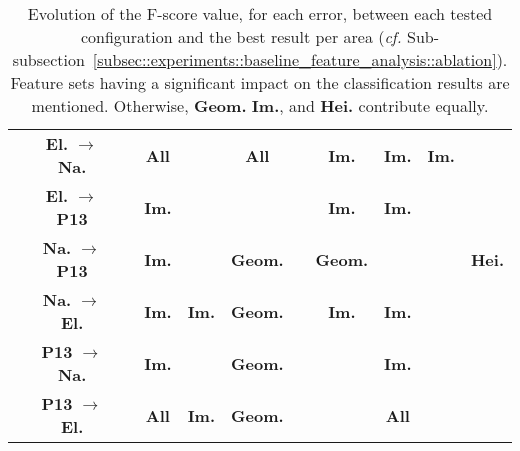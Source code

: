\begin{table}[htbp]
\begin{tabular}{| c | c | x{1.5cm} c c c |c c c c c|}
                \hline
                & \textbf{El.} \(\rightarrow\) \textbf{Na.} &  &  \textbf{All} &  &  \textbf{All} &  &  \textbf{Im.} &  \textbf{Im.} &  \textbf{Im.} &  \\
                & \textbf{El.} \(\rightarrow\) \textbf{P13} &  &  \textbf{Im.} &  &  &  &  \textbf{Im.} &  \textbf{Im.} &  &  \\
                & \textbf{Na.} \(\rightarrow\) \textbf{P13} &  &  \textbf{Im.} &  &  \textbf{Geom.} &  &  \textbf{Geom.} &  &  &  \textbf{Hei.} \\
                & \textbf{Na.} \(\rightarrow\) \textbf{El.} &  &  \textbf{Im.} &  \textbf{Im.} &  \textbf{Geom.} &  &  \textbf{Im.} &  \textbf{Im.} &  &  \\
                & \textbf{P13} \(\rightarrow\) \textbf{Na.} &  &  \textbf{Im.} &  &  \textbf{Geom.} &  &  &  \textbf{Im.} &  &  \\
                & \textbf{P13} \(\rightarrow\) \textbf{El.} &  &  \textbf{All} &  \textbf{Im.} &  \textbf{Geom.} &  &  &  \textbf{All} &  & \\
                \hline
            \end{tabular}
            \renewcommand{\arraystretch}{1}
            \caption{
                \label{tab::transferability_comparison} Evolution of the F-score value, for each error, between each tested configuration and the best result per area (\textit{cf.} Sub-subsection~\ref{subsec::experiments::baseline_feature_analysis::ablation}).
                Feature sets having a significant impact on the classification results are mentioned.
                Otherwise, \textbf{Geom.} \textbf{Im.}, and \textbf{Hei.} contribute equally.
}
\end{table}
